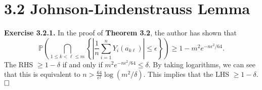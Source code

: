 \documentclass[12pt]{extarticle}
\begin{document}
\section*{3.2 Johnson-Lindenstrauss Lemma}
\textbf{Exercise 3.2.1.}
In the proof of \textbf{Theorem 3.2}, the author has shown that
\[
\mathbb{P}\left(
\bigcap_{1\leq k<\ell\leq m}
\left\{
\left|\frac{1}{n}\sum_{i=1}^nY_i(a_{k\ell})\right|\leq\epsilon\right\}\right)
\geq
1-m^2e^{-n\epsilon^2/64}.
\]
The RHS $\geq 1-\delta$ if and only if $m^2e^{-n\epsilon^2/64}\leq\delta$. By taking logarithms, we can see that this is equivalent to $n>\frac{64}{\epsilon^2}\log(m^2/\delta)$.
This implies that the LHS $\geq 1-\delta$. $\hspace{\fill}\square$
%
\end{document}
